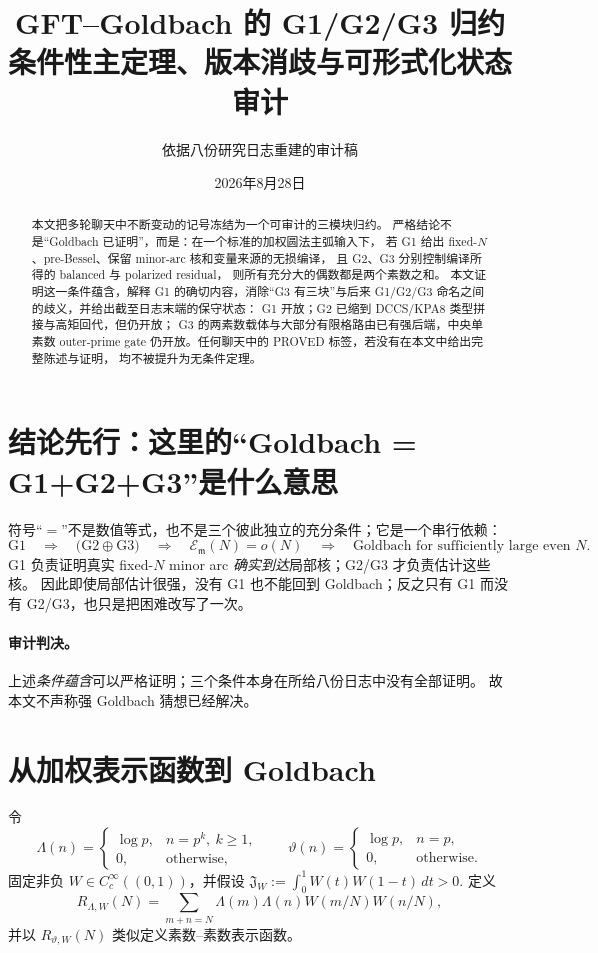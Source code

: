 \documentclass[11pt,a4paper]{ctexart}
\title{GFT--Goldbach 的 G1/G2/G3 归约\\
\large 条件性主定理、版本消歧与可形式化状态审计}
\author{依据八份研究日志重建的审计稿}
\date{2026年8月28日}
\theoremstyle{definition}
\newcommand{\E}{\mathcal E}
\begin{document}
\maketitle

\begin{abstract}
本文把多轮聊天中不断变动的记号冻结为一个可审计的三模块归约。
严格结论不是“Goldbach 已证明”，而是：在一个标准的加权圆法主弧输入下，
若 G1 给出 fixed-$N$、pre-Bessel、保留 minor-arc 核和变量来源的无损编译，
且 G2、G3 分别控制编译所得的 balanced 与 polarized residual，
则所有充分大的偶数都是两个素数之和。
本文证明这一条件蕴含，解释 G1 的确切内容，消除“G3 有三块”与后来
G1/G2/G3 命名之间的歧义，并给出截至日志末端的保守状态：
G1 开放；G2 已缩到 DCCS/KPA8 类型拼接与高矩回代，但仍开放；
G3 的两素数载体与大部分有限格路由已有强后端，中央单素数 outer-prime gate
仍开放。任何聊天中的 \textsf{PROVED} 标签，若没有在本文中给出完整陈述与证明，
均不被提升为无条件定理。
\end{abstract}

\section{结论先行：这里的“Goldbach = G1+G2+G3”是什么意思}

符号“$=$”不是数值等式，也不是三个彼此独立的充分条件；它是一个串行依赖：
\[
\boxed{
\mathrm{G1}\quad\Longrightarrow\quad
\bigl(\mathrm{G2}\oplus\mathrm{G3}\bigr)
\quad\Longrightarrow\quad
\E_{\mathfrak m}(N)=o(N)
\quad\Longrightarrow\quad
\text{Goldbach for sufficiently large even }N.}
\]
G1 负责证明真实 fixed-$N$ minor arc \emph{确实到达}局部核；G2/G3 才负责估计这些核。
因此即使局部估计很强，没有 G1 也不能回到 Goldbach；反之只有 G1 而没有
G2/G3，也只是把困难改写了一次。

\paragraph{审计判决。}
上述\emph{条件蕴含}可以严格证明；三个条件本身在所给八份日志中没有全部证明。
故本文不声称强 Goldbach 猜想已经解决。

\section{从加权表示函数到 Goldbach}

令
\[
\Lambda(n)=\begin{cases}\log p,&n=p^k,\ k\ge1,\\0,&\text{otherwise},\end{cases}
\qquad
\vartheta(n)=\begin{cases}\log p,&n=p,\\0,&\text{otherwise}.
\end{cases}
\]
固定非负 $W\in C_c^\infty((0,1))$，并假设
\(
\mathfrak J_W:=\int_0^1W(t)W(1-t)\,dt>0.
\)
定义
\[
R_{\Lambda,W}(N)
=\sum_{m+n=N}\Lambda(m)\Lambda(n)W(m/N)W(n/N),
\]
并以 $R_{\vartheta,W}(N)$ 类似定义素数--素数表示函数。
\end{document}
